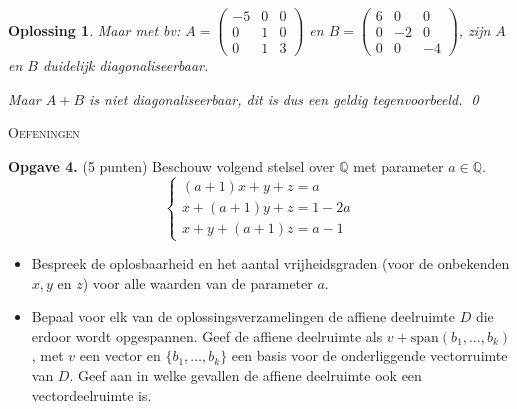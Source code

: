\documentclass[a4paper,12pt]{article}
\newtheorem{oplossing}{Oplossing}
\begin{document}
\begin{enumerate}
\begin{itemize}
\begin{oplossing}
        Maar met bv: 
        \(A  = \begin{pmatrix}
            -5 & 0 & 0 \\
            0 & 1 & 0\\
            0 & 1 & 3
        \end{pmatrix}\)
        en
        \( B = \begin{pmatrix}
            6 & 0 & 0 \\
            0 & -2 & 0\\
            0 & 0 & -4
        \end{pmatrix}\),
        zijn \(A\) en \(B\) duidelijk diagonaliseerbaar.
        
        Maar \(A+B\) is niet diagonaliseerbaar, dit is dus een geldig tegenvoorbeeld. \qed
    \end{oplossing}
\end{itemize}

\newpage

\begin{center}
    \textsc{Oefeningen}
\end{center}


\vspace{0.5cm}

\textbf{Opgave 4.} (5 punten) Beschouw volgend stelsel over $\mathbb{Q}$ met parameter $a \in \mathbb{Q}$.
\[
\begin{cases}
(a + 1)x + y + z = a \\
x + (a + 1)y + z = 1 - 2a \\
x + y + (a + 1)z = a - 1
\end{cases}
\]
\begin{itemize}
    \item[(i)] Bespreek de oplosbaarheid en het aantal vrijheidsgraden (voor de onbekenden $x, y$ en $z$) voor alle waarden van de parameter $a$.
    \item[(ii)] Bepaal voor elk van de oplossingsverzamelingen de affiene deelruimte $D$ die erdoor wordt opgespannen. Geef de affiene deelruimte als $v + \text{span}(b_1, \dots, b_k)$, met $v$ een vector en $\{b_1, \dots, b_k\}$ een basis voor de onderliggende vectorruimte van $D$. Geef aan in welke gevallen de affiene deelruimte ook een vectordeelruimte is.
\end{itemize}

\vspace{0.5cm}



\end{enumerate}
\end{document}
